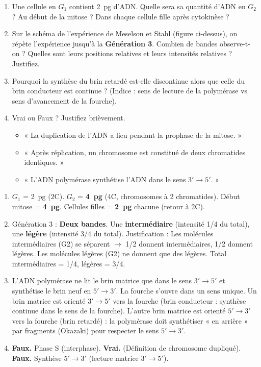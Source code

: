 \documentclass[11pt]{article}
\begin{document}
\begin{exercice}
\begin{enumerate}
    \item Une cellule en $G_1$ contient \SI{2}{pg} d'ADN. Quelle sera sa quantité d'ADN en $G_2$ ? Au début de la mitose ? Dans chaque cellule fille après cytokinèse ?
    \item Sur le schéma de l'expérience de Meselson et Stahl (figure ci-dessus), on répète l'expérience jusqu'à la \textbf{Génération 3}. Combien de bandes observe-t-on ? Quelles sont leurs positions relatives et leurs intensités relatives ? Justifiez.
    \item Pourquoi la synthèse du brin retardé est-elle discontinue alors que celle du brin conducteur est continue ? (Indice : sens de lecture de la polymérase vs sens d'avancement de la fourche).
    \item Vrai ou Faux ? Justifiez brièvement.
    \begin{itemize}
        \item « La duplication de l'ADN a lieu pendant la prophase de la mitose. »
        \item « Après réplication, un chromosome est constitué de deux chromatides identiques. »
        \item « L'ADN polymérase synthétise l'ADN dans le sens $3' \to 5'$. »
    \end{itemize}
\end{enumerate}
\end{exercice}

\begin{corrige}
\begin{enumerate}
    \item $G_1$ = \SI{2}{pg} (2C). $G_2$ = \textbf{\SI{4}{pg}} (4C, chromosomes à 2 chromatides). Début mitose = \textbf{\SI{4}{pg}}. Cellules filles = \textbf{\SI{2}{pg}} chacune (retour à 2C).
    \item Génération 3 : \textbf{Deux bandes}. Une \textbf{intermédiaire} (intensité 1/4 du total), une \textbf{légère} (intensité 3/4 du total). Justification : Les molécules intermédiaires (G2) se séparent $\to$ 1/2 donnent intermédiaires, 1/2 donnent légères. Les molécules légères (G2) ne donnent que des légères. Total intermédiaires = 1/4, légères = 3/4.
    \item L'ADN polymérase ne lit le brin matrice que dans le sens $3' \to 5'$ et synthétise le brin neuf en $5' \to 3'$. La fourche s'ouvre dans un sens unique. Un brin matrice est orienté $3' \to 5'$ vers la fourche (brin conducteur : synthèse continue dans le sens de la fourche). L'autre brin matrice est orienté $5' \to 3'$ vers la fourche (brin retardé) : la polymérase doit synthétiser « en arrière » par fragments (Okazaki) pour respecter le sens $5' \to 3'$.
    \item \textbf{Faux.} Phase S (interphase). \textbf{Vrai.} (Définition de chromosome dupliqué). \textbf{Faux.} Synthèse $5' \to 3'$ (lecture matrice $3' \to 5'$).
\end{enumerate}
\end{corrige}
\end{document}
